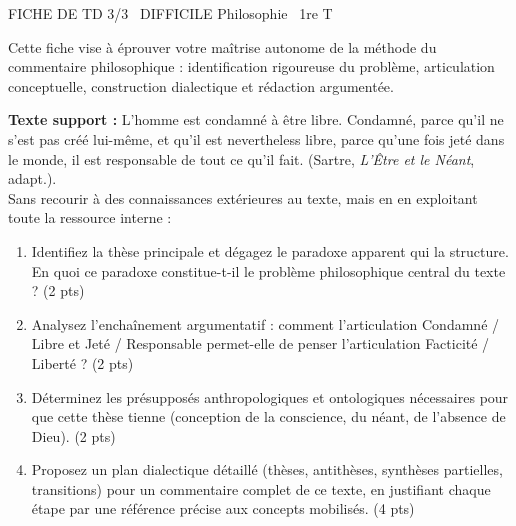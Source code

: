 \documentclass[11pt]{article}
\begin{document}
\begin{tcolorbox}[enhanced,colback=popink,colframe=popink,arc=10pt,boxrule=0pt,left=12pt,right=12pt,top=9pt,bottom=9pt]
{\color{white}\popxbold\small FICHE DE TD 3/3 \textbullet\ DIFFICILE \hfill Philosophie \textbullet\ 1re T\par}
\end{tcolorbox}
\vspace{4pt}
\noindent Cette fiche vise à éprouver votre maîtrise autonome de la méthode du commentaire philosophique : identification rigoureuse du problème, articulation conceptuelle, construction dialectique et rédaction argumentée.

\begin{exercice}
\textbf{Texte support :} \og L'homme est condamné à être libre. Condamné, parce qu'il ne s'est pas créé lui-même, et qu'il est nevertheless libre, parce qu'une fois jeté dans le monde, il est responsable de tout ce qu'il fait. \fg{} (Sartre, \textit{L'Être et le Néant}, adapt.).\\
\noindent Sans recourir à des connaissances extérieures au texte, mais en en exploitant toute la ressource interne :
\begin{enumerate}
    \item Identifiez la thèse principale et dégagez le paradoxe apparent qui la structure. En quoi ce paradoxe constitue-t-il le problème philosophique central du texte ? (2 pts)
    \item Analysez l'enchaînement argumentatif : comment l'articulation \og Condamné / Libre \fg{} et \og Jeté / Responsable \fg{} permet-elle de penser l'articulation Facticité / Liberté ? (2 pts)
    \item Déterminez les présupposés anthropologiques et ontologiques nécessaires pour que cette thèse tienne (conception de la conscience, du néant, de l'absence de Dieu). (2 pts)
    \item Proposez un plan dialectique détaillé (thèses, antithèses, synthèses partielles, transitions) pour un commentaire complet de ce texte, en justifiant chaque étape par une référence précise aux concepts mobilisés. (4 pts)
\end{enumerate}
\end{exercice}
\end{document}
